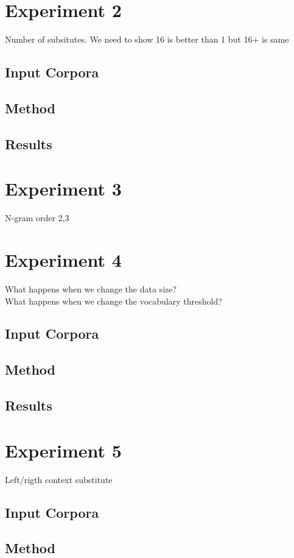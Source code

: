\section{Experiment 2}
Number of subsitutes.  We need to show 16 is better than 1 but 16+ is same
\subsection{Input Corpora}
\subsection{Method}
\subsection{Results}

\section{Experiment 3}
N-gram order 2,3

\section{Experiment 4}
What happens when we change the data size?\\
What happens when we change the vocabulary threshold?\\

\subsection{Input Corpora}
\subsection{Method}
\subsection{Results}

\section{Experiment 5}
Left/rigth context substitute
\subsection{Input Corpora}
\subsection{Method}

